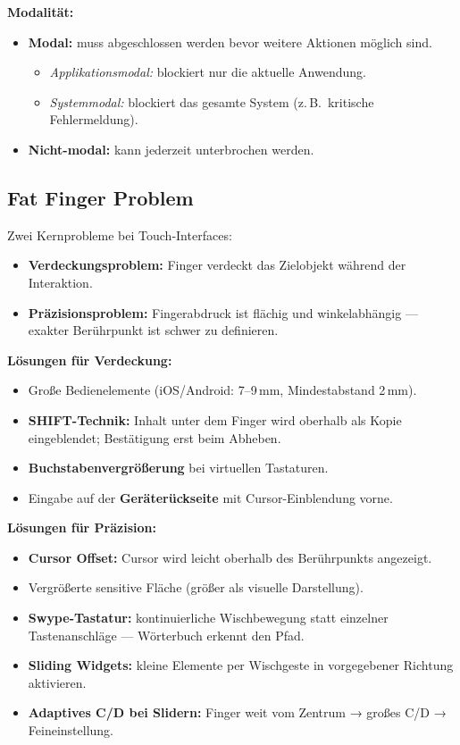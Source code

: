\documentclass[12pt, a4paper]{article}
\begin{document}
\textbf{Modalität:}
\begin{itemize}
  \item \textbf{Modal:} muss abgeschlossen werden bevor weitere Aktionen möglich sind.
    \begin{itemize}
      \item \textit{Applikationsmodal:} blockiert nur die aktuelle Anwendung.
      \item \textit{Systemmodal:} blockiert das gesamte System (z.\,B.\ kritische Fehlermeldung).
    \end{itemize}
  \item \textbf{Nicht-modal:} kann jederzeit unterbrochen werden.
\end{itemize}

\subsection{Fat Finger Problem}

Zwei Kernprobleme bei Touch-Interfaces:
\begin{itemize}
  \item \textbf{Verdeckungsproblem:} Finger verdeckt das Zielobjekt während der Interaktion.
  \item \textbf{Präzisionsproblem:} Fingerabdruck ist flächig und winkelabhängig — exakter Berührpunkt ist schwer zu definieren.
\end{itemize}

\textbf{Lösungen für Verdeckung:}
\begin{itemize}
  \item Große Bedienelemente (iOS/Android: 7–9\,mm, Mindestabstand 2\,mm).
  \item \textbf{SHIFT-Technik:} Inhalt unter dem Finger wird oberhalb als Kopie eingeblendet; Bestätigung erst beim Abheben.
  \item \textbf{Buchstabenvergrößerung} bei virtuellen Tastaturen.
  \item Eingabe auf der \textbf{Geräterückseite} mit Cursor-Einblendung vorne.
\end{itemize}

\textbf{Lösungen für Präzision:}
\begin{itemize}
  \item \textbf{Cursor Offset:} Cursor wird leicht oberhalb des Berührpunkts angezeigt.
  \item Vergrößerte sensitive Fläche (größer als visuelle Darstellung).
  \item \textbf{Swype-Tastatur:} kontinuierliche Wischbewegung statt einzelner Tastenanschläge — Wörterbuch erkennt den Pfad.
  \item \textbf{Sliding Widgets:} kleine Elemente per Wischgeste in vorgegebener Richtung aktivieren.
  \item \textbf{Adaptives C/D bei Slidern:} Finger weit vom Zentrum → großes C/D → Feineinstellung.
\end{itemize}
\end{document}

